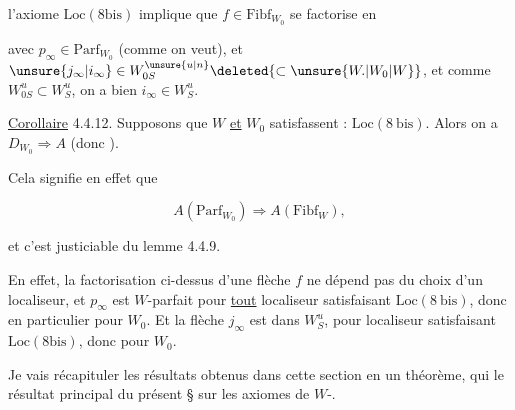 
 l'axiome $\mathrm{Loc}(8\mathrm{bis})$ implique que $f\in\mathrm{Fibf}_{W_0}$ se factorise en



avec $p_\infty\in\mathrm{Parf}_{W_0}$ (comme on veut), et $\unsure{j_\infty|i_\infty}\in W_{0S}^{\unsure{u|n}}\deleted{\subset\unsure{W.|W_0|W}}$, et comme $W_{0S}^{u}\subset W_S^{u}$, on a bien $i_\infty\in W_S^{u}$.

\uline{Corollaire} 4.4.12. Supposons que $W$ \uline{et} $W_0$ satisfassent : $\mathrm{Loc}(8\ \mathrm{bis})$. Alors on a $D_{W_0}\Longrightarrow A$ (donc ).

Cela signifie en effet que

\[
 A(\mathrm{Parf}_{W_0})\Longrightarrow A(\mathrm{Fibf}_W),
\]

et c'est  justiciable du lemme 4.4.9.

En effet, la factorisation ci-dessus d'une flèche $f$ ne dépend pas du choix d'un localiseur, et $p_\infty$ est $W$-parfait pour \uline{tout} localiseur satisfaisant $\mathrm{Loc}(8\ \mathrm{bis})$, donc en particulier pour $W_0$. Et la flèche $j_\infty$ est dans $W_S^u$, pour  localiseur satisfaisant $\mathrm{Loc}(8\mathrm{bis})$, donc pour $W_0$.

Je vais récapituler les résultats obtenus dans cette section en un théorème, qui  le résultat principal du présent \S{} sur les axiomes de $W$-.

